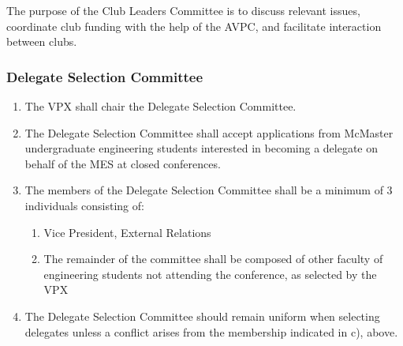 The purpose of the Club Leaders Committee is to discuss relevant issues,
coordinate club funding with the help of the AVPC, and facilitate
interaction between clubs.

\hypertarget{delegate-selection-committee}{%
 \subsubsection{Delegate Selection
  Committee}
 \label{delegate-selection-committee}}

\begin{enumerate}
 \item
  The VPX shall chair the Delegate Selection Committee.
 \item
  The Delegate Selection Committee shall accept applications from
  McMaster undergraduate engineering students interested in becoming a
  delegate on behalf of the MES at closed conferences.
 \item
  The members of the Delegate Selection Committee shall be a minimum of
  3 individuals consisting of:

  \begin{enumerate}
   \item
    Vice President, External Relations
   \item
    The remainder of the committee shall be composed of other faculty of
    engineering students not attending the conference, as selected by
    the VPX
  \end{enumerate}
 \item
  The Delegate Selection Committee should remain uniform when selecting
  delegates unless a conflict arises from the membership indicated in
  c), above.
\end{enumerate}

